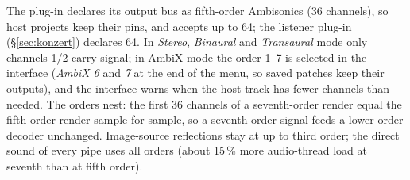 \documentclass[11pt,a4paper,parskip=half,DIV=11,toc=bibliography]{scrartcl}
\newcommand{\ui}[1]{\emph{#1}}                 %
\begin{document}
The plug-in declares its output bus as fifth-order Ambisonics (36 channels), so host projects keep their pins, and
accepts up to 64; the listener plug-in (\S\ref{sec:konzert}) declares 64. In \ui{Stereo},
\ui{Binaural} and \ui{Transaural} mode only channels 1/2 carry signal; in AmbiX mode the order 1--7 is selected in the
interface (\ui{AmbiX 6} and \ui{7} at the end of the menu, so saved patches keep their outputs), and the interface warns when
the host track has fewer channels than needed. The orders nest: the first 36 channels of a seventh-order render equal the
fifth-order render sample for sample, so a seventh-order signal feeds a lower-order decoder unchanged. Image-source
reflections stay at up to third order; the direct sound of every pipe uses all orders (about 15\,\% more audio-thread load
at seventh than at fifth order).
\end{document}
